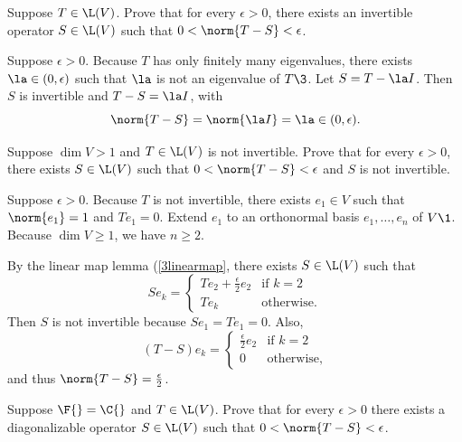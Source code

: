 \exercise
Suppose $T \in \L(V)$. Prove that for every $\epsilon > 0$, there exists an invertible operator $S \in \L(V)$ such that $0 < \norm{T - S} < \epsilon$. \label{7invert}

\begin{Solution}
Suppose $\epsilon > 0$. Because $T$ has only finitely many eigenvalues, there exists $\la \in (0, \epsilon)$ such that $\la$ is not an eigenvalue of $T\3$. Let
$S = T - \la I$. Then $S$ is invertible and $T - S = \la I$, with
\[
\norm{T - S} = \norm{\la I} = \la \in (0, \epsilon).
\]
\end{Solution}

\exercise
Suppose $\dim V > 1$ and $T \in \L(V)$ is not invertible. Prove that for every $\epsilon > 0$, there exists
$S \in \L(V)$ such that $0 < \norm{T - S} < \epsilon$ and $S$ is not invertible.

\begin{Solution}
Suppose $\epsilon > 0$. Because $T$ is not invertible, there exists $e_1 \in V$ such that $\norm{e_1} = 1$ and $Te_1 = 0$. Extend $e_1$ to an orthonormal basis $e_1, \ldots, e_n$ of $V\1$. Because $\dim V \ge 1$, we have $n \ge 2$.

By the linear map lemma (\ref{3linearmap}, there exists $S \in \L(V)$ such that
\[
Se_k = \begin{cases}
Te_2 + \frac{\epsilon}{2}e_2 & \text{if } k = 2 \\[3bp]
Te_k & \text{otherwise}.
\end{cases}
\]
Then $S$ is not invertible because $Se_1 = Te_1 = 0$. Also,
\[
(T-S)e_k = \begin{cases}
\frac{\epsilon}{2}e_2 & \text{if } k = 2 \\[3bp]
0 & \text{otherwise},
\end{cases}
\]
and thus $\norm{T-S} = \frac{\epsilon}{2}$.
\end{Solution}

\exercise
Suppose $\F{} = \C{}$ and $T \in \L(V)$. Prove that for every $\epsilon > 0$ there exists a diagonalizable operator $S \in \L(V)$ such that $0 < \norm{T - S} < \epsilon$.

